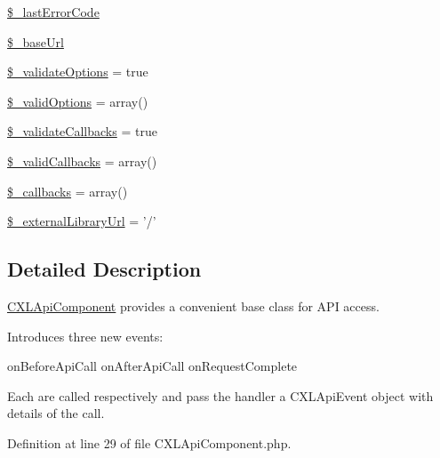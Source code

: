 \begin{DoxyCompactItemize}
\item 
\hyperlink{classCXLApiComponent_a9d205559114adfd52ac69bbb094a8a1a}{\$\_\-lastErrorCode}
\item 
\hyperlink{classCXLApiComponent_ae5c686cdf8e6a089b6296dcb659f6d01}{\$\_\-baseUrl}
\item 
\hyperlink{classCXLApiComponent_a06b741ce121a93d6010e3c514edba22b}{\$\_\-validateOptions} = true
\item 
\hyperlink{classCXLApiComponent_afe1adfd2c4c57954ea5230cae01d1c47}{\$\_\-validOptions} = array()
\item 
\hyperlink{classCXLApiComponent_a73fdad41769f4f4ef1ebeaba5380ffad}{\$\_\-validateCallbacks} = true
\item 
\hyperlink{classCXLApiComponent_aadd5e6fdc7ba1ec3b3e4a916c4f005d0}{\$\_\-validCallbacks} = array()
\item 
\hyperlink{classCXLApiComponent_ae1d5e7a4a34ac8fa4dbdef28983a1fcc}{\$\_\-callbacks} = array()
\item 
\hyperlink{classCXLApiComponent_aae8a45534cedd7fc0881ca1995d8bb9c}{\$\_\-externalLibraryUrl} = '/'
\end{DoxyCompactItemize}


\subsection{Detailed Description}
\hyperlink{classCXLApiComponent}{CXLApiComponent} provides a convenient base class for API access.

Introduces three new events:

onBeforeApiCall onAfterApiCall onRequestComplete

Each are called respectively and pass the handler a CXLApiEvent object with details of the call. 

Definition at line 29 of file CXLApiComponent.php.



